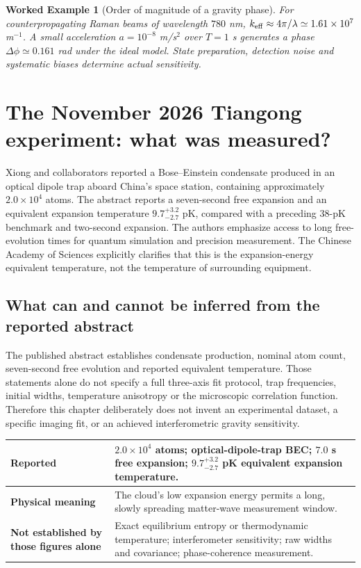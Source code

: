 \documentclass[11pt,a4paper]{article}
\newtheorem{example}{Worked Example}
\begin{document}
\begin{example}[Order of magnitude of a gravity phase]
For counterpropagating Raman beams of wavelength $780$ nm, $k_{\rm eff}\approx4\pi/\lambda\simeq1.61\times10^7$ m$^{-1}$. A small acceleration $a=10^{-8}$ m/s$^2$ over $T=1$ s generates a phase $\Delta\phi\simeq0.161$ rad under the ideal model. State preparation, detection noise and systematic biases determine actual sensitivity.
\end{example}

\section{The November 2026 Tiangong experiment: what was measured?}
Xiong and collaborators reported a Bose--Einstein condensate produced in an optical dipole trap aboard China's space station, containing approximately $2.0\times10^4$ atoms. The abstract reports a seven-second free expansion and an equivalent expansion temperature $9.7^{+3.2}_{-2.7}$ pK, compared with a preceding $38$-pK benchmark and two-second expansion. The authors emphasize access to long free-evolution times for quantum simulation and precision measurement. The Chinese Academy of Sciences explicitly clarifies that this is the expansion-energy equivalent temperature, not the temperature of surrounding equipment.

\subsection{What can and cannot be inferred from the reported abstract}
The published abstract establishes condensate production, nominal atom count, seven-second free evolution and reported equivalent temperature. Those statements alone do not specify a full three-axis fit protocol, trap frequencies, initial widths, temperature anisotropy or the microscopic correlation function. Therefore this chapter deliberately does not invent an experimental dataset, a specific imaging fit, or an achieved interferometric gravity sensitivity.

\begin{center}\begin{tabularx}{\linewidth}{>{\bfseries}p{.36\linewidth}X}\toprule
Reported & $2.0\times10^4$ atoms; optical-dipole-trap BEC; $7.0$ s free expansion; $9.7^{+3.2}_{-2.7}$ pK equivalent expansion temperature.\\\midrule
Physical meaning & The cloud's low expansion energy permits a long, slowly spreading matter-wave measurement window.\\\midrule
Not established by those figures alone & Exact equilibrium entropy or thermodynamic temperature; interferometer sensitivity; raw widths and covariance; phase-coherence measurement.\\\bottomrule\end{tabularx}\end{center}
\end{document}
